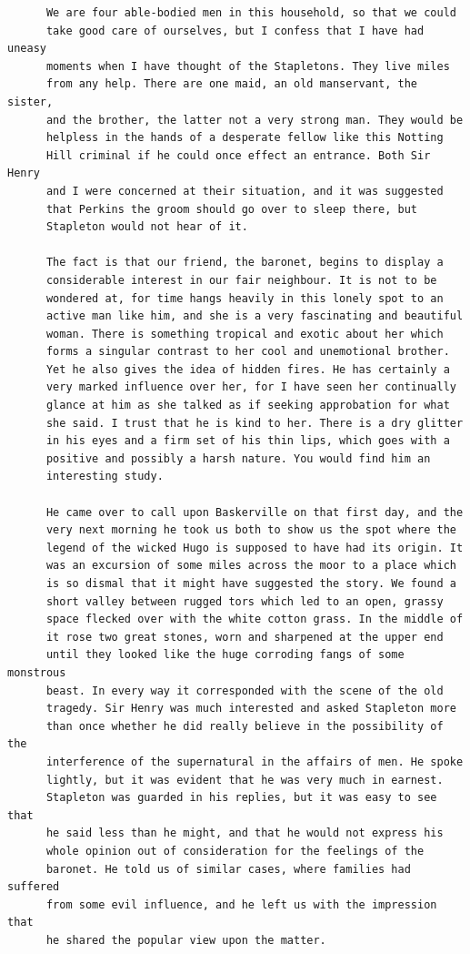 \documentclass{article}
\begin{document}
\begin{verbatim}
      We are four able-bodied men in this household, so that we could
      take good care of ourselves, but I confess that I have had uneasy
      moments when I have thought of the Stapletons. They live miles
      from any help. There are one maid, an old manservant, the sister,
      and the brother, the latter not a very strong man. They would be
      helpless in the hands of a desperate fellow like this Notting
      Hill criminal if he could once effect an entrance. Both Sir Henry
      and I were concerned at their situation, and it was suggested
      that Perkins the groom should go over to sleep there, but
      Stapleton would not hear of it.

      The fact is that our friend, the baronet, begins to display a
      considerable interest in our fair neighbour. It is not to be
      wondered at, for time hangs heavily in this lonely spot to an
      active man like him, and she is a very fascinating and beautiful
      woman. There is something tropical and exotic about her which
      forms a singular contrast to her cool and unemotional brother.
      Yet he also gives the idea of hidden fires. He has certainly a
      very marked influence over her, for I have seen her continually
      glance at him as she talked as if seeking approbation for what
      she said. I trust that he is kind to her. There is a dry glitter
      in his eyes and a firm set of his thin lips, which goes with a
      positive and possibly a harsh nature. You would find him an
      interesting study.

      He came over to call upon Baskerville on that first day, and the
      very next morning he took us both to show us the spot where the
      legend of the wicked Hugo is supposed to have had its origin. It
      was an excursion of some miles across the moor to a place which
      is so dismal that it might have suggested the story. We found a
      short valley between rugged tors which led to an open, grassy
      space flecked over with the white cotton grass. In the middle of
      it rose two great stones, worn and sharpened at the upper end
      until they looked like the huge corroding fangs of some monstrous
      beast. In every way it corresponded with the scene of the old
      tragedy. Sir Henry was much interested and asked Stapleton more
      than once whether he did really believe in the possibility of the
      interference of the supernatural in the affairs of men. He spoke
      lightly, but it was evident that he was very much in earnest.
      Stapleton was guarded in his replies, but it was easy to see that
      he said less than he might, and that he would not express his
      whole opinion out of consideration for the feelings of the
      baronet. He told us of similar cases, where families had suffered
      from some evil influence, and he left us with the impression that
      he shared the popular view upon the matter.


\end{verbatim}
\end{document}
